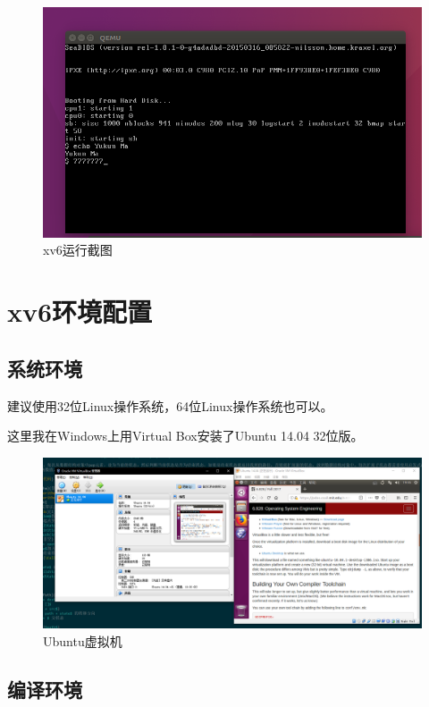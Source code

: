 \documentclass[forprint]{WHUBachelor}
\begin{document}
\begin{figure}[H]
  \centering
  \includegraphics[width=6in]{figures/xv6/show.png}
  \caption{xv6运行截图}\label{fig:xv6:show}
\end{figure}

\chapter{xv6环境配置}

\section{系统环境}

建议使用32位Linux操作系统，64位Linux操作系统也可以。

这里我在Windows上用Virtual Box安装了Ubuntu 14.04 32位版。

\begin{figure}[H]
  \centering
  \includegraphics[width=6in]{figures/prep/vm.png}
  \caption{Ubuntu虚拟机}\label{fig:prep:vm}
\end{figure}

\section{编译环境}
\end{document}
